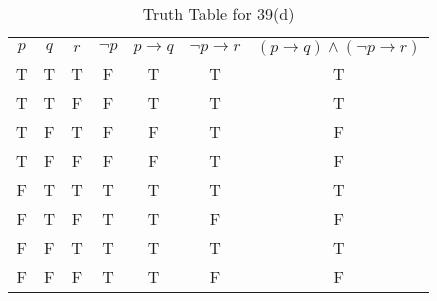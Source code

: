 \documentclass{Axon}
\begin{document}
\begin{table}[ht]
    \centering
    \begin{tabular}{c|c|c|c|c|c|c}
    \(p\) & \(q\) & \(r\) & \(\lnot p\) & \(p \to q\) & \(\lnot p \to r\) & \((p \to q) \land (\lnot p \to r)\) \\
    T     & T     & T     & F           & T           & T                 & T                                   \\
    T     & T     & F     & F           & T           & T                 & T                                   \\
    T     & F     & T     & F           & F           & T                 & F                                   \\
    T     & F     & F     & F           & F           & T                 & F                                   \\
    F     & T     & T     & T           & T           & T                 & T                                   \\
    F     & T     & F     & T           & T           & F                 & F                                   \\
    F     & F     & T     & T           & T           & T                 & T                                   \\
    F     & F     & F     & T           & T           & F                 & F                                   
    \end{tabular}
    \caption{Truth Table for 39(d)}
\end{table}
\end{document}
